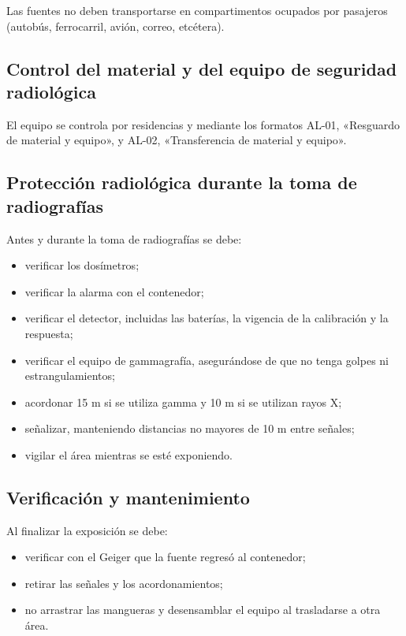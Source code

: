 Las fuentes no deben transportarse en compartimentos ocupados por pasajeros (autobús, ferrocarril, avión, correo, etcétera).

\subsection{Control del material y del equipo de seguridad radiológica}

El equipo se controla por residencias y mediante los formatos AL-01, «Resguardo de material y equipo», y AL-02, «Transferencia de material y equipo».

\subsection{Protección radiológica durante la toma de radiografías}

Antes y durante la toma de radiografías se debe:
\begin{itemize}
  \item verificar los dosímetros;
  \item verificar la alarma con el contenedor;
  \item verificar el detector, incluidas las baterías, la vigencia de la calibración y la respuesta;
  \item verificar el equipo de gammagrafía, asegurándose de que no tenga golpes ni estrangulamientos;
  \item acordonar 15 m si se utiliza gamma y 10 m si se utilizan rayos X;
  \item señalizar, manteniendo distancias no mayores de 10 m entre señales;
  \item vigilar el área mientras se esté exponiendo.
\end{itemize}

\subsection{Verificación y mantenimiento}

Al finalizar la exposición se debe:
\begin{itemize}
  \item verificar con el Geiger que la fuente regresó al contenedor;
  \item retirar las señales y los acordonamientos;
  \item no arrastrar las mangueras y desensamblar el equipo al trasladarse a otra área.
\end{itemize}

